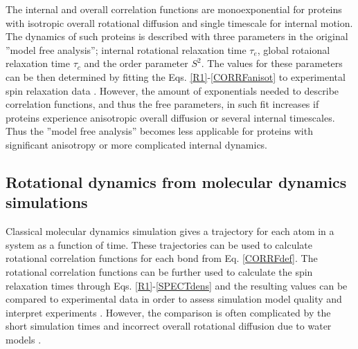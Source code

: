 \documentclass[pre,aps,floatfix,authordate1-4,twocolumn]{revtex4-1}
\begin{document}
The internal and overall correlation functions are monoexponential for proteins 
with isotropic overall rotational diffusion and single timescale for internal motion. 
The dynamics of such proteins is described with three parameters in the
original ''model free analysis''; internal rotational relaxation time $\tau_e$,
global rotaional relaxation time $\tau_c$ and the order parameter $S^2$.
The values for these parameters can be then determined by fitting the 
Eqs. \ref{R1}-\ref{CORRFanisot} to experimental spin relaxation data \cite{??}.
However, the amount of exponentials needed to describe correlation functions,
and thus the free parameters, in such fit increases if 
proteins experience anisotropic overall diffusion or several internal timescales.
Thus the ''model free analysis'' becomes less applicable for proteins with significant
anisotropy or more complicated internal dynamics.


\subsection{Rotational dynamics from molecular dynamics simulations}\label{MDanalysis}
Classical molecular dynamics simulation gives a trajectory for each atom in
a system as a function of time. These trajectories can be used to
calculate rotational correlation functions for each bond from Eq. \ref{CORRFdef}.
The rotational correlation functions can be further used to calculate the
spin relaxation times through Eqs. \ref{R1}-\ref{SPECTdens} and the resulting
values can be compared to experimental data in order to assess simulation model
quality \cite{??} and interpret experiments \cite{??}.
However, the comparison is often complicated by
the short simulation times \cite{??} and incorrect overall rotational
diffusion due to water models \cite{??}.
\end{document}
